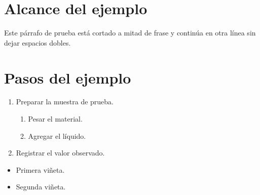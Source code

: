 

\section{Alcance del ejemplo}
Este párrafo de prueba está cortado
	a mitad de frase y continúa en
otra línea sin dejar espacios dobles.

\section{Pasos del ejemplo}
	\begin{enumerate}
	\item Preparar la muestra de prueba.
	\begin{enumerate}
		\item Pesar el material.
		\item Agregar el líquido.
	\end{enumerate}
	\item Registrar el valor observado.
\label{itm:X:a}
	\end{enumerate}

	\begin{itemize}
	\item Primera viñeta.
	\item Segunda viñeta.
	\end{itemize}
